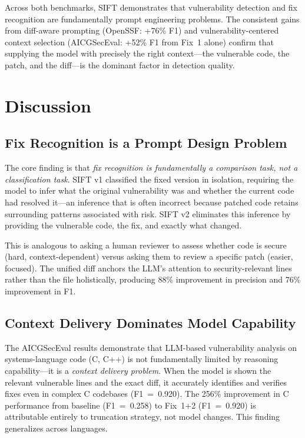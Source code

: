 \documentclass[conference]{IEEEtran}
\begin{document}
Across both benchmarks, SIFT demonstrates that vulnerability detection and fix recognition are fundamentally prompt engineering problems. The consistent gains from diff-aware prompting (OpenSSF: +76\% F1) and vulnerability-centered context selection (AICGSecEval: +52\% F1 from Fix~1 alone) confirm that supplying the model with precisely the right context---the vulnerable code, the patch, and the diff---is the dominant factor in detection quality.

\section{Discussion}

\subsection{Fix Recognition is a Prompt Design Problem}

The core finding is that \textit{fix recognition is fundamentally a comparison task, not a classification task}. SIFT v1 classified the fixed version in isolation, requiring the model to infer what the original vulnerability was and whether the current code had resolved it---an inference that is often incorrect because patched code retains surrounding patterns associated with risk. SIFT v2 eliminates this inference by providing the vulnerable code, the fix, and exactly what changed.

This is analogous to asking a human reviewer to assess whether code is secure (hard, context-dependent) versus asking them to review a specific patch (easier, focused). The unified diff anchors the LLM's attention to security-relevant lines rather than the file holistically, producing 88\% improvement in precision and 76\% improvement in F1.

\subsection{Context Delivery Dominates Model Capability}

The AICGSecEval results demonstrate that LLM-based vulnerability analysis on systems-language code (C, C++) is not fundamentally limited by reasoning capability---it is a \textit{context delivery problem}. When the model is shown the relevant vulnerable lines and the exact diff, it accurately identifies and verifies fixes even in complex C codebases (F1~=~0.920). The 256\% improvement in C performance from baseline (F1~=~0.258) to Fix~1+2 (F1~=~0.920) is attributable entirely to truncation strategy, not model changes. This finding generalizes across languages.
\end{document}
